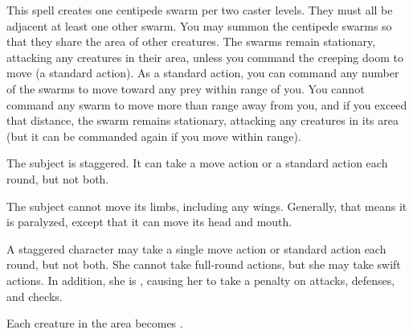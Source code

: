 \spelldur{\durmed}
\begin{spelleffect}
  This spell creates one centipede swarm per two caster levels. They must all be adjacent at least one other swarm. You may summon the centipede swarms so that they share the area of other creatures. The swarms remain stationary, attacking any creatures in their area, unless you command the creeping doom to move (a standard action). As a standard action, you can command any number of the swarms to move toward any prey within \rngmed range of you. You cannot command any swarm to move more than \rngmed range away from you, and if you exceed that distance, the swarm remains stationary, attacking any creatures in its area (but it can be commanded again if you move within range).
\end{spelleffect}

\spellrng{\rngmed}
\spelldur{\durshort}
\begin{spellhealthy}
  The subject is staggered. It can take a move action or a standard action each round, but not both. 
\end{spellhealthy}
\begin{spellblood}
  The subject cannot move its limbs, including any wings. Generally, that means it is paralyzed, except that it can move its head and mouth.
\end{spellblood}
\begin{spellnotes}
 A staggered character may take a single move action or standard action each round, but not both. She cannot take full-round actions, but she may take swift actions. In addition, she is \vulnerable, causing her to take a  penalty on attacks, defenses, and checks.
\end{spellnotes}

\spelldur{\durmed}
\begin{spelleffect}
  Each creature in the area becomes \vulnerable.
\end{spelleffect}

